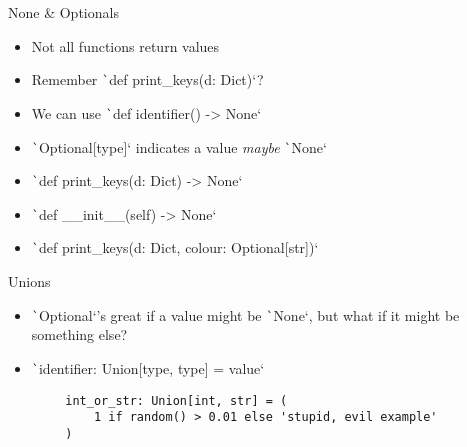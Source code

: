 \documentclass[10pt]{beamer}
\begin{document}
\begin{frame}{None \& Optionals}
    \begin{itemize}[<+->]
        \item Not all functions return values
        \item Remember \texttt`def print_keys(d: Dict)`?
        \item We can use \texttt`def identifier() -> None`
        \item \texttt`Optional[type]` indicates a value \emph{maybe} \texttt`None`
    \end{itemize}

    \pause\begin{examples}
    \begin{itemize}[<+->]
        \item \texttt`def print_keys(d: Dict) -> None`
        \item \texttt`def __init__(self) -> None`
        \item \texttt`def print_keys(d: Dict, colour: Optional[str])`
    \end{itemize}
    \end{examples}
\end{frame}

\begin{frame}[fragile]{Unions}
    \begin{itemize}[<+->]
        \item \texttt`Optional`'s great if a value might be \texttt`None`, but what if it might be something else?
        \item \texttt`identifier: Union[type, type] = value`
    \end{itemize}

    \pause\begin{examples}
    \begin{verbatim}
        int_or_str: Union[int, str] = (
            1 if random() > 0.01 else 'stupid, evil example'
        )
    \end{verbatim}
    \end{examples}
\end{frame}
\end{document}
